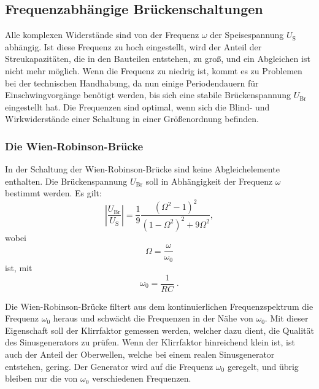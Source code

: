 \subsection{Frequenzabhängige Brückenschaltungen}

    Alle komplexen Widerstände sind von der Frequenz $\omega$ der Speisespannung $U_\text{S}$ abhängig.
    Ist diese Frequenz zu hoch eingestellt, wird der Anteil der Streukapazitäten, die in den Bauteilen
    entstehen, zu groß, und ein Abgleichen ist nicht mehr möglich.
    Wenn die Frequenz zu niedrig ist, kommt es zu Problemen bei der technischen Handhabung,
    da nun einige Periodendauern für Einschwingvorgänge benötigt werden, bis sich eine stabile Brückenspannung $U_\text{Br}$
    eingestellt hat.
    Die Frequenzen sind optimal, wenn sich die Blind- und Wirkwiderstände einer Schaltung
    in einer Größenordnung befinden.

    \subsubsection{Die Wien-Robinson-Brücke}

        In der Schaltung der Wien-Robinson-Brücke sind keine Abgleichelemente enthalten.
        Die Brückenspannung $U_\text{Br}$ soll in Abhängigkeit der Frequenz $\omega$ bestimmt werden.
        Es gilt:
        \begin{equation}
            \left\lvert \frac{U_\text{Br}}{U_\text{S}} \right\rvert = \frac{1}{9} \frac{(\Omega^2 - 1)^2}{(1 - \Omega^2)^2 + 9\Omega^2},
        \end{equation}
        wobei
        \begin{equation}
            \Omega = \frac{\omega}{\omega_0} \label{eqn: GroßOmega}
        \end{equation}
        ist, mit
        \begin{equation}
            \omega_0 = \frac{1}{RC} \; . \label{eqn: omeganull}
        \end{equation}

        Die Wien-Robinson-Brücke filtert aus dem kontinuierlichen Frequenzspektrum die Frequenz $\omega_0$ heraus
        und schwächt die Frequenzen in der Nähe von $\omega_0$.
        Mit dieser Eigenschaft soll der Klirrfaktor gemessen werden, welcher dazu dient, die Qualität des
        Sinusgenerators zu prüfen.
        Wenn der Klirrfaktor hinreichend klein ist, ist auch der Anteil der Oberwellen, welche bei einem
        realen Sinusgenerator entstehen, gering.
        Der Generator wird auf die Frequenz $\omega_0$ geregelt, und übrig bleiben nur die von $\omega_0$
        verschiedenen Frequenzen.


